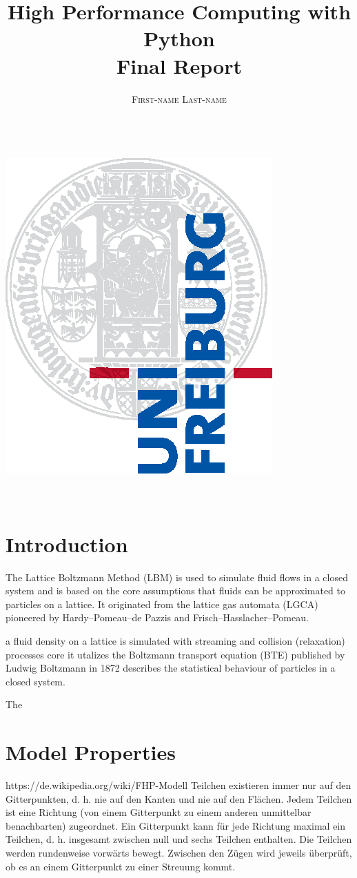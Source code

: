 \documentclass[a4paper,11pt]{report}
\title{\Huge \textbf{High Performance Computing with Python} \vspace{4mm} \\ \huge Final Report}
\author{\textsc{First-name Last-name} \\ \vspace{3mm}\text{matriculation number}  \\
\vspace{3mm}\text{email-address}}
\begin{document}
\makeatletter
\begin{titlepage}
    \begin{center}
        \includegraphics[width=0.5\linewidth]{logos/Uni_Logo-Grundversion_E1_A4_CMYK.eps}\\[4ex]
        {\huge \bfseries  \@title }\\[2ex]
        {\LARGE  \@author}\\[30ex]
        {\large \@date}
    \end{center}
\end{titlepage}
\makeatother
\thispagestyle{empty}
\newpage



\tableofcontents

\section{Introduction}
The Lattice Boltzmann Method (LBM) is used to simulate fluid flows in a closed system and is based on the core assumptions that fluids can be approximated to particles on a lattice.
It originated from the lattice gas automata (LGCA) pioneered by Hardy–Pomeau–de Pazzis and Frisch–Hasslacher–Pomeau.

a fluid density on a lattice is simulated with streaming and collision (relaxation) processes
core it utalizes the Boltzmann transport equation (BTE) published by Ludwig Boltzmann in 1872 describes the statistical behaviour of particles in a closed system.

The


\section{Model Properties}
https://de.wikipedia.org/wiki/FHP-Modell
Teilchen existieren immer nur auf den Gitterpunkten, d. h. nie auf den Kanten und nie auf den Flächen.
Jedem Teilchen ist eine Richtung (von einem Gitterpunkt zu einem anderen unmittelbar benachbarten) zugeordnet.
Ein Gitterpunkt kann für jede Richtung maximal ein Teilchen, d. h. insgesamt zwischen null und sechs Teilchen enthalten.
Die Teilchen werden rundenweise vorwärts bewegt. Zwischen den Zügen wird jeweils überprüft, ob es an einem Gitterpunkt zu einer Streuung kommt.











\end{document}
